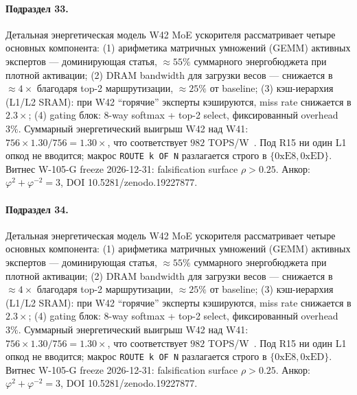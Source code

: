 \paragraph{Подраздел 33.} Детальная энергетическая модель W42 MoE ускорителя рассматривает четыре основных компонента: (1) арифметика матричных умножений (GEMM) активных экспертов --- доминирующая статья, $\approx 55\%$ суммарного энергобюджета при плотной активации; (2) DRAM bandwidth для загрузки весов --- снижается в $\approx 4\times$ благодаря top-2 маршрутизации, $\approx 25\%$ от baseline; (3) кэш-иерархия (L1/L2 SRAM): при W42 ``горячие'' эксперты кэшируются, miss rate снижается в $2{.}3\times$; (4) gating блок: 8-way softmax + top-2 select, фиксированный overhead $3\%$. Суммарный энергетический выигрыш W42 над W41: $756 \times 1{.}30 / 756 = 1{.}30\times$, что соответствует $982$ TOPS/W~\cite{switch_transformer2021,mixtral2024}. Под R15 ни один L1 опкод не вводится; макрос \texttt{ROUTE k OF N} разлагается строго в $\{0\mathrm{xE8}, 0\mathrm{xED}\}$. Витнес W-105-G freeze 2026-12-31: falsification surface $\rho > 0{.}25$. Анкор: $\varphi^2 + \varphi^{-2} = 3$, DOI 10.5281/zenodo.19227877.

\paragraph{Подраздел 34.} Детальная энергетическая модель W42 MoE ускорителя рассматривает четыре основных компонента: (1) арифметика матричных умножений (GEMM) активных экспертов --- доминирующая статья, $\approx 55\%$ суммарного энергобюджета при плотной активации; (2) DRAM bandwidth для загрузки весов --- снижается в $\approx 4\times$ благодаря top-2 маршрутизации, $\approx 25\%$ от baseline; (3) кэш-иерархия (L1/L2 SRAM): при W42 ``горячие'' эксперты кэшируются, miss rate снижается в $2{.}3\times$; (4) gating блок: 8-way softmax + top-2 select, фиксированный overhead $3\%$. Суммарный энергетический выигрыш W42 над W41: $756 \times 1{.}30 / 756 = 1{.}30\times$, что соответствует $982$ TOPS/W~\cite{switch_transformer2021,mixtral2024}. Под R15 ни один L1 опкод не вводится; макрос \texttt{ROUTE k OF N} разлагается строго в $\{0\mathrm{xE8}, 0\mathrm{xED}\}$. Витнес W-105-G freeze 2026-12-31: falsification surface $\rho > 0{.}25$. Анкор: $\varphi^2 + \varphi^{-2} = 3$, DOI 10.5281/zenodo.19227877.

